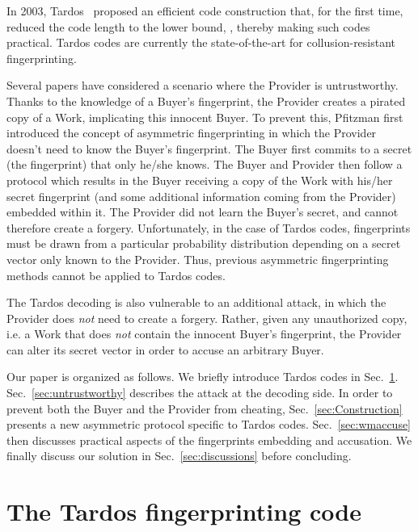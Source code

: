 \documentclass{article}
\begin{document}
In 2003, Tardos~\cite{Tardos2003Optimal} proposed an efficient code
construction that, for the first time, reduced the code length
  to the lower bound, , thereby
making such codes practical.  Tardos codes are currently the
state-of-the-art for collusion-resistant fingerprinting.

Several papers have considered a scenario where the Provider is untrustworthy.
Thanks to the knowledge of a Buyer's fingerprint,
the Provider creates a pirated copy of a Work, implicating this innocent Buyer.
To prevent this, Pfitzman \cite{PfitzmannAsym} first introduced the concept of asymmetric
fingerprinting in which the Provider doesn't need to know the Buyer's fingerprint. 
The Buyer first
commits to a secret (the fingerprint) that only he/she knows.  The
Buyer and Provider then follow a protocol which results in the Buyer
receiving a copy of the Work with his/her secret fingerprint (and some
additional information coming from the Provider) embedded within it.
The Provider did not learn the Buyer's secret, and cannot
therefore create a forgery.  Unfortunately, in the case of Tardos
codes, fingerprints must be drawn from a particular
probability distribution depending on a secret vector only known to the Provider.
Thus, previous asymmetric fingerprinting methods cannot be applied 
to Tardos codes.

The Tardos decoding is also vulnerable to an additional attack, in
which the Provider does {\em not} need to create a forgery.  Rather,
given any unauthorized copy, i.e. a Work that does {\em not} contain the
innocent Buyer's fingerprint, the Provider can alter its secret
vector in order to accuse an arbitrary Buyer.



Our paper is organized as follows. We briefly
  introduce Tardos codes in Sec.~\ref{sec:tardos}.  
  Sec.~\ref{sec:untrustworthy} describes the attack
  at the decoding side.  In order to
  prevent both the Buyer and the Provider from cheating, 
  Sec.~\ref{sec:Construction} presents a new asymmetric protocol
  specific to Tardos codes. Sec.~\ref{sec:wmaccuse} then discusses
  practical aspects of the fingerprints embedding and accusation.  We
  finally discuss our solution in Sec.~\ref{sec:discussions} before
  concluding.


\section{The Tardos fingerprinting code}
\label{sec:tardos}
\end{document}
